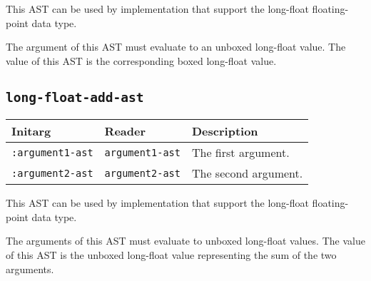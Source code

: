 This AST can be used by implementation that support the long-float
floating-point data type.  

The argument of this AST must evaluate to an unboxed long-float
value.  The value of this AST is the corresponding boxed long-float
value.

\subsection{\texttt{long-float-add-ast}}
\label{sec-ast-long-float-add}

\begin{tabular}{|l|l|l|}
\hline
Initarg & Reader & Description\\
\hline\hline
\texttt{:argument1-ast} & \texttt{argument1-ast} & The first argument.\\
\hline
\texttt{:argument2-ast} & \texttt{argument2-ast} & The second argument.\\
\hline
\end{tabular}

This AST can be used by implementation that support the long-float
floating-point data type.  

The arguments of this AST must evaluate to unboxed long-float
values.  The value of this AST is the unboxed long-float value
representing the sum of the two arguments.

